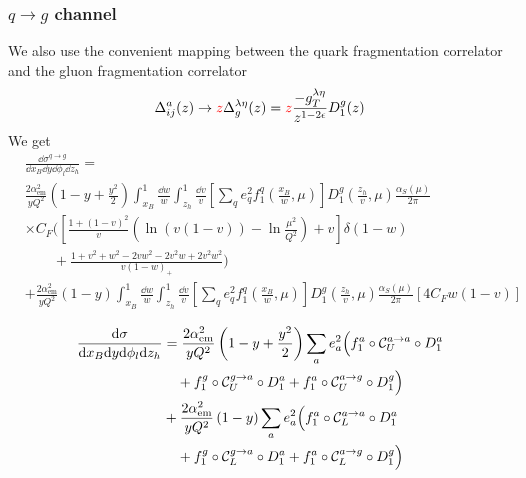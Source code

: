 \subsubsection{$q \to g$ channel}
We also use the convenient mapping between the quark fragmentation correlator and the gluon fragmentation correlator
\begin{equation}
    \Delta_{ij}^a(z)\to\textcolor{red}{z}\Delta^{\lambda\eta}_g(z)=\textcolor{red}{z}\frac{-g_T^{\lambda\eta}}{{z^{1-2\epsilon}}}D_1^g(z)
\end{equation}
We get
\begin{equation}
    \begin{aligned}
        &\frac{\dd \sigma^{q \to g}}{\dd x_B \dd y \dd \phi_l\dd z_h}=\\
        &\frac{2\alpha_{\text{em}}^2}{yQ^2}\left(1-y+\frac{y^2}{2}\right)\int_{x_B}^1\frac{\dd w}{w}\int_{z_h}^1\frac{\dd v}{v} \left[\sum_q e_q^2f_1^q\left(\frac{x_B}{w},\mu\right)\right]D_1^g\left(\frac{z_h}{v},\mu\right)\frac{\alpha_S(\mu)}{2\pi}\\
        &\times C_F\Bigg(\left[\frac{1+(1-v)^2}{v}\left(\ln \left(v(1-v)\right)-\ln\frac{\mu^2}{Q^2}\right)+v\right]\delta(1-w)\\
        &\qquad+\frac{1+v^2+w^2-2vw^2-2v^2w+2v^2w^2}{v(1-w)_+}\Bigg)\\
        &+\frac{2\alpha_{\text{em}}^2}{yQ^2}\left(1-y\right)\int_{x_B}^1\frac{\dd w}{w}\int_{z_h}^1\frac{\dd v}{v} \left[\sum_q e_q^2f_1^q\left(\frac{x_B}{w},\mu\right)\right]D_1^g\left(\frac{z_h}{v},\mu\right)\frac{\alpha_S(\mu)}{2\pi}\left[4C_Fw(1-v)\right]
    \end{aligned}
\end{equation}


\begin{equation}
    \begin{aligned}
        \frac{\dd \sigma}{\dd x_B \dd y \dd \phi_l \dd z_h}&=\frac{2 \alpha_{\rm em}^2}{y Q^2} \left(1-y+\frac{y^2}{2}\right)\sum_a e_a^2 \Big(f_1^a \circ \mathcal{C}_U^{a \to a} \circ D_1^a \\
        &\quad +f_1^g \circ \mathcal{C}_{U}^{g \to a} \circ D_1^a+f_1^a \circ \mathcal{C}_U^{a \to g} \circ D_1^g \Big)\\
        &+\frac{2 \alpha_{\rm em}^2}{y Q^2} \left(1-y\right)\sum_a e_a^2 \Big(f_1^a \circ \mathcal{C}_L^{a \to a} \circ D_1^a \\
        &\quad +f_1^g \circ \mathcal{C}_L^{g \to a} \circ D_1^a+f_1^a \circ \mathcal{C}_L^{a \to g} \circ D_1^g \Big)
    \end{aligned}
\end{equation}
